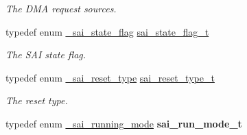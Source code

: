 \begin{DoxyCompactItemize}
\begin{DoxyCompactList}\small\item\em The D\+MA request sources. \end{DoxyCompactList}\item 
typedef enum \hyperlink{group__sai__hal_gaa95d2087778fca116c3d7df0e3bd943e}{\+\_\+sai\+\_\+state\+\_\+flag} \hyperlink{group__sai__hal_gafe5a7889b1a42b3e54be7cad3091a5ee}{sai\+\_\+state\+\_\+flag\+\_\+t}\hypertarget{group__sai__hal_gafe5a7889b1a42b3e54be7cad3091a5ee}{}\label{group__sai__hal_gafe5a7889b1a42b3e54be7cad3091a5ee}

\begin{DoxyCompactList}\small\item\em The S\+AI state flag. \end{DoxyCompactList}\item 
typedef enum \hyperlink{group__sai__hal_gaaa4bb640acb35ece5d999635e41f033a}{\+\_\+sai\+\_\+reset\+\_\+type} \hyperlink{group__sai__hal_gaca36f65012b1a99022d1bc02be2d33c5}{sai\+\_\+reset\+\_\+type\+\_\+t}\hypertarget{group__sai__hal_gaca36f65012b1a99022d1bc02be2d33c5}{}\label{group__sai__hal_gaca36f65012b1a99022d1bc02be2d33c5}

\begin{DoxyCompactList}\small\item\em The reset type. \end{DoxyCompactList}\item 
typedef enum \hyperlink{group__sai__hal_gaf88043ae2cb5faaa066820476c2665e6}{\+\_\+sai\+\_\+running\+\_\+mode} {\bfseries sai\+\_\+run\+\_\+mode\+\_\+t}\hypertarget{group__sai__hal_gaa8a525ada4e31e02c8f174b81da202ec}{}\label{group__sai__hal_gaa8a525ada4e31e02c8f174b81da202ec}

\end{DoxyCompactItemize}
